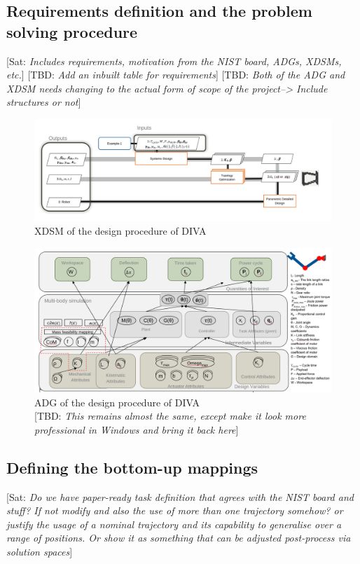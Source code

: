 \documentclass[letterpaper, 10 pt, conference]{ieeeconf}  %
\newcommand{\asc}[1]{{\color{blue!50!black} [Sat: {\em #1}]}\xspace}
\newcommand{\tbd}[1]{{\color{red!100!black} [TBD: {\em #1}]}\xspace}
\begin{document}
\subsection{Requirements definition and the problem solving procedure}
\asc{Includes requirements, motivation from the NIST board, ADGs, XDSMs, etc.}
\tbd{Add an inbuilt table for requirements}
\tbd{Both of the ADG and XDSM needs changing to the actual form of scope of the project--> Include structures or not}
\begin{figure}[h]
	\centering
	\includegraphics[scale=0.1]{xdsm-diva.png}
	\caption{XDSM of the design procedure of DIVA}
	\label{fig:xdsm}
\end{figure}

\begin{figure}[h]
	\centering
	\includegraphics[scale=0.1]{adg-diva.png}
	\caption{ADG of the design procedure of DIVA\\\tbd{This remains almost the same, except make it look more professional in Windows and bring it back here}}
	\label{fig:adg}
\end{figure}

\subsection{Defining the bottom-up mappings}
\asc{Do we have paper-ready task definition that agrees with the NIST board and stuff? If not modify and also the use of more than one trajectory somehow? or justify the usage of a nominal trajectory and its capability to generalise over a range of positions. Or show it as something that can be adjusted post-process via solution spaces}
\end{document}
